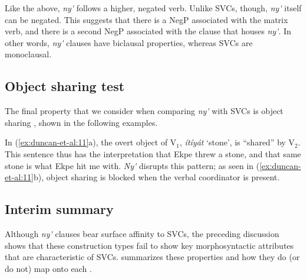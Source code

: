 \documentclass[output=paper,modfonts,nonflat,
colorlinks, citecolor=brown,
]{langsci/langscibook}
\begin{document}
\noindent Like the  above, \textit{ny\'{\textturnv}\ng} follows a higher, negated verb. Unlike SVCs, though, \textit{ny\'{\textturnv}\ng} itself can be negated. This suggests that there is a NegP associated with the matrix verb, and there is a second NegP associated with the clause that houses \textit{ny\'{\textturnv}\ng}. In other words, \textit{ny\'{\textturnv}\ng} clauses have biclausal properties, whereas SVCs are monoclausal.

\subsection{Object sharing test}\label{sec:duncan-et-al:2.4}

The final property that we consider when comparing \textit{ny\'{\textturnv}\ng} with SVCs is object sharing \citep{baker1989object}, shown in the following examples.

\ea\label{ex:duncan-et-al:11}
\z
\z

\noindent In (\ref{ex:duncan-et-al:11}a), the overt object of V$_1$, \textit{ítíyát} `stone', is ``shared'' by V$_2$. This sentence thus has the interpretation that Ekpe threw a stone, and that same stone is what Ekpe hit me with. \textit{Ny\'{\textturnv}\ng} disrupts this pattern; as seen in (\ref{ex:duncan-et-al:11}b), object sharing is blocked when the verbal coordinator is present.

\subsection{Interim summary}\label{sec:duncan-et-al:2.5}

Although \textit{ny\'{\textturnv}\ng} clauses bear surface affinity to SVCs, the preceding discussion shows that these construction types fail to show key morphosyntactic attributes that are characteristic of SVCs.  summarizes these properties and how they do (or do not) map onto each .
\end{document}
